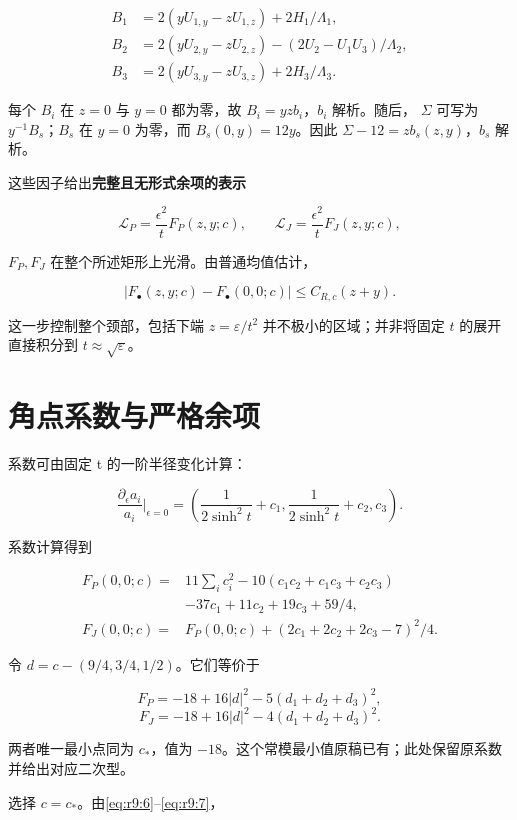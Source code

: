 \documentclass[UTF8,11pt,fontset=none]{ctexart}
\begin{document}
\[
\begin{aligned}
B_1&=2(yU_{1,y}-zU_{1,z})+2H_1/\Lambda_1,\\
B_2&=2(yU_{2,y}-zU_{2,z})-(2U_2-U_1U_3)/\Lambda_2,\\
B_3&=2(yU_{3,y}-zU_{3,z})+2H_3/\Lambda_3.
\end{aligned}
\]

每个 \(B_i\) 在 \(z=0\) 与 \(y=0\) 都为零，故 \(B_i=yzb_i\)，\(b_i\) 解析。随后， \(\Sigma\) 可写为 \(y^{-1}B_s\)；\(B_s\) 在 \(y=0\) 为零，而 \(B_s(0,y)=12y\)。因此 \(\Sigma-12=zb_s(z,y)\)，\(b_s\) 解析。

这些因子给出\textbf{完整且无形式余项的表示}

\[
\boxed{\mathscr L_P=\frac{\epsilon^2}{t}F_P(z,y;c),\qquad
\mathscr L_J=\frac{\epsilon^2}{t}F_J(z,y;c),}
\tag{9.6}\label{eq:r9:6}
\]

\(F_P,F_J\) 在整个所述矩形上光滑。由普通均值估计，

\[
 |F_\bullet(z,y;c)-F_\bullet(0,0;c)|\le C_{R,c}(z+y).
\tag{9.7}\label{eq:r9:7}
\]

这一步控制整个颈部，包括下端 \(z=\varepsilon/t^2\) 并不极小的区域；并非将固定 \(t\) 的展开直接积分到 \(t\approx\sqrt\varepsilon\)。

\section{角点系数与严格余项}\label{ch9:ux89d2ux70b9ux7cfbux6570ux4e0eux4e25ux683cux4f59ux9879}

系数可由固定 t 的一阶半径变化计算：

\[
\frac{\partial_\epsilon a_i}{a_i}\Big|_{\epsilon=0}
=\left(\frac1{2\sinh^2t}+c_1,
\frac1{2\sinh^2t}+c_2,c_3\right).
\]

系数计算得到

\[
\begin{aligned}
F_P(0,0;c)={}&11\sum_i c_i^2
 -10(c_1c_2+c_1c_3+c_2c_3)\\
&-37c_1+11c_2+19c_3+59/4,\\
F_J(0,0;c)={}&F_P(0,0;c)+(2c_1+2c_2+2c_3-7)^2/4.
\end{aligned}
\]

令 \(d=c-(9/4,3/4,1/2)\)。它们等价于

\[
F_P=-18+16|d|^2-5(d_1+d_2+d_3)^2,
\] \[
F_J=-18+16|d|^2-4(d_1+d_2+d_3)^2.
\]

两者唯一最小点同为 \(c_*\)，值为 \(-18\)。这个常模最小值原稿已有；此处保留原系数并给出对应二次型。

选择 \(c=c_*\)。由\eqref{eq:r9:6}--\eqref{eq:r9:7}，
\end{document}
